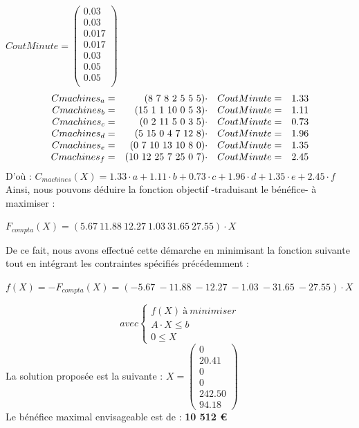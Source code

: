 \documentclass[a4paper, 11pt]{article}
\begin{document}
$CoutMinute = \begin{pmatrix}
        0.03\\
        0.03\\
        0.017\\
        0.017\\
        0.03\\
        0.05\\
        0.05\\
    \end{pmatrix}$
$$
\begin{array}{r r l l}
    Cmachines_a = & (8~7~8~2~5~5~5)\cdot  & CoutMinute = & 1.33 \\
    Cmachines_b = & (15~1~1~10~0~5~3)\cdot   & CoutMinute = & 1.11 \\
    Cmachines_c = & (0~2~11~5~0~3~5)\cdot   & CoutMinute = & 0.73 \\
    Cmachines_d = & (5~15~0~4~7~12~8)\cdot   & CoutMinute = & 1.96 \\
    Cmachines_e = & (0~7~10~13~10~8~0)\cdot  & CoutMinute = & 1.35 \\
    Cmachines_f = & (10~12~25~7~25~0~7)\cdot & CoutMinute = & 2.45 \\
\end{array}
$$
D'où : $C_{machines}(X) = 1.33\cdot a + 1.11\cdot b + 0.73\cdot c + 1.96\cdot d + 1.35\cdot e + 2.45\cdot f  $ \\
Ainsi, nous pouvons déduire la fonction objectif -traduisant le bénéfice- à maximiser :
\begin{center}
$F_{compta} (X) = (5.67~11.88~12.27~1.03~31.65~27.55)\cdot X$ \\
\end{center}

De ce fait, nous avons effectué cette démarche en minimisant la fonction suivante tout en intégrant les contraintes spécifiés précédemment :
\begin{center}
$f(X) = -F_{compta} (X) = (-5.67~-11.88~-12.27~-1.03~-31.65~-27.55)\cdot X$ \\
\end{center}
$$
avec \left\{\begin{split}
	f(X)\ à\ minimiser\\
    A\cdot X \leq b\\
    0 \leq X
\end{split}\right.
$$
La solution proposée est la suivante :
$ X =\begin{pmatrix}
0\\
20.41\\
0\\
0\\
242.50\\
94.18
\end{pmatrix} $\\
Le bénéfice maximal envisageable est de : \textbf{10 512 €}
\end{document}
